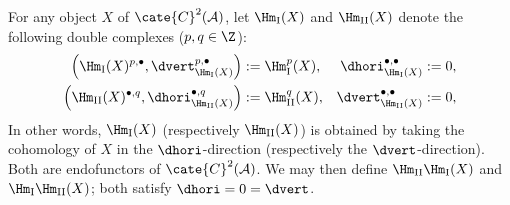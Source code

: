 For any object $X$ of $\cate{C}^2(\mathcal{A})$, let
$\Hm_{\mathrm{I}}(X)$ and $\Hm_{\mathrm{II}}(X)$ denote the following double
complexes ($p,q\in\Z$):
\begin{equation}\label{eqn:HIHII}\begin{aligned}
	\left( \Hm_{\mathrm{I}}(X)^{p, \bullet}, \dvert_{\Hm_{\mathrm{I}}(X)}^{p, \bullet} \right) & := \Hm_{\mathrm{I}}^p(X), &
	\dhori_{\Hm_{\mathrm{I}}(X)}^{\bullet, \bullet} := 0, \\
	\left( \Hm_{\mathrm{II}}(X)^{\bullet, q}, \dhori_{\Hm_{\mathrm{II}}(X)}^{\bullet, q} \right) & := \Hm_{\mathrm{II}}^q(X), &
	\dvert_{\Hm_{\mathrm{II}}(X)}^{\bullet, \bullet} := 0,
\end{aligned}\end{equation}
In other words, $\Hm_{\mathrm{I}}(X)$ (respectively
$\Hm_{\mathrm{II}}(X)$) is obtained by taking the cohomology of $X$ in the
$\dhori$-direction (respectively the $\dvert$-direction). Both are endofunctors
of $\cate{C}^2(\mathcal{A})$. We may then define
$\Hm_{\mathrm{II}}\Hm_{\mathrm{I}}(X)$ and
$\Hm_{\mathrm{I}}\Hm_{\mathrm{II}}(X)$; both satisfy
$\dhori=0=\dvert$.

